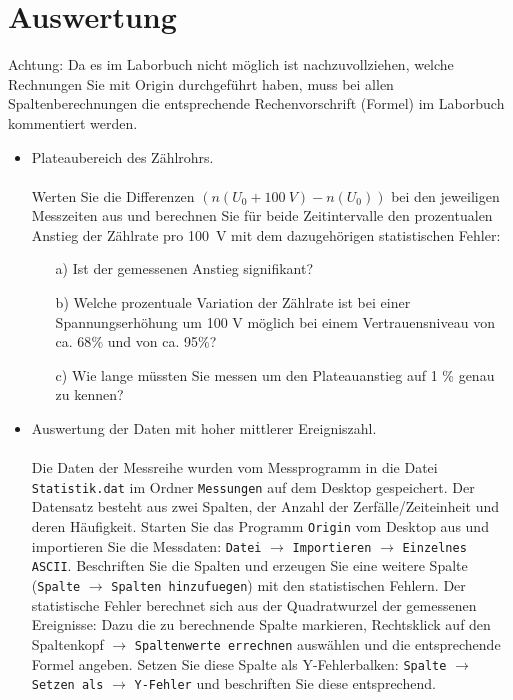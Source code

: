 \documentclass[
    landscape,
    twocolumn
]{article}
\begin{document}
\section{Auswertung}
Achtung: Da es im Laborbuch nicht m\"{o}glich ist nachzuvollziehen, welche Rechnungen Sie mit Origin durchgef\"{u}hrt haben, muss bei allen Spaltenberechnungen die entsprechende Rechenvorschrift (Formel) im Laborbuch kommentiert werden.
\begin{itemize}
  \item Plateaubereich des Z\"{a}hlrohrs.\\
  \\Werten Sie die Differenzen $(n(U_0+100~V) - n(U_0))$  bei den jeweiligen Messzeiten aus und
  berechnen Sie f\"{u}r beide Zeitintervalle den prozentualen Anstieg der Z\"{a}hlrate pro 100~V mit dem dazugeh\"{o}rigen
  statistischen Fehler:
  \begin{itemize}
    \item [a)]	Ist der gemessenen Anstieg signifikant?
    \item [b)]	Welche prozentuale Variation der Z\"{a}hlrate ist bei einer Spannungserh\"{o}hung um 100 V m\"{o}glich bei einem Vertrauensniveau von ca. 68$\%$ und von ca. 95$\%$?
    \item [c)]	Wie lange m\"{u}ssten Sie messen um den Plateauanstieg auf 1 $\%$ genau zu kennen?
  \end{itemize}
  \item  Auswertung der Daten mit hoher mittlerer Ereigniszahl.\\
  \\Die Daten der Messreihe wurden vom Messprogramm in die Datei  \verb"Statistik.dat" im Ordner  \verb"Messungen"  auf dem Desktop gespeichert. Der Datensatz besteht aus zwei Spalten, der Anzahl der Zerf\"{a}lle/Zeiteinheit und deren H\"{a}ufigkeit.
    Starten Sie das Programm \verb"Origin" vom Desktop aus und importieren Sie die Messdaten:
\verb"Datei" $\rightarrow$ \verb"Importieren" $\rightarrow$ \verb"Einzelnes ASCII". Beschriften Sie die Spalten und erzeugen Sie eine weitere Spalte (\verb"Spalte" $\rightarrow$ \verb"Spalten hinzufuegen") mit den statistischen Fehlern. Der statistische Fehler berechnet sich aus der Quadratwurzel der gemessenen Ereignisse: Dazu die zu berechnende Spalte markieren, Rechtsklick auf den Spaltenkopf $\rightarrow$ \verb"Spaltenwerte errechnen" ausw\"{a}hlen und die entsprechende Formel angeben. Setzen Sie diese Spalte als  Y-Fehlerbalken: \verb"Spalte" $\rightarrow$ \verb"Setzen als" $\rightarrow$ \verb"Y-Fehler" und beschriften Sie diese entsprechend.


\end{itemize}
\end{document}
